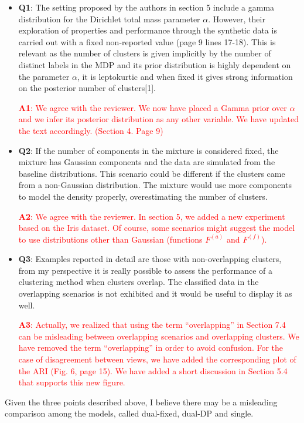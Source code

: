 \documentclass[]{article}
\newcommand\done[1]{\textcolor{red}{#1}}
\begin{document}
	\vspace{3mm}	
	\begin{itemize}
		\item \textbf{Q1}: The setting proposed by the authors in section 5 include a gamma distribution for the Dirichlet total mass parameter $\alpha$. However, their exploration of properties and performance through the synthetic data is carried out with a fixed non-reported value (page 9 lines 17-18). This is relevant as the number of clusters is given implicitly by the number of distinct labels in the MDP and its prior distribution is highly dependent on the parameter $\alpha$, it is leptokurtic and when fixed it gives strong information on the posterior number of clusters[1].
		
		\textcolor{red}{  \textbf{A1}: We agree with the reviewer. We now have placed a Gamma prior over $\alpha$ and we infer its posterior distribution as any other variable. We have updated the text accordingly. (Section 4. Page 9)} 
		
		\item \textbf{Q2}: If the number of components in the mixture is considered fixed, the mixture has Gaussian components and the data are simulated from the baseline distributions. This scenario could be different if the clusters came from a non-Gaussian distribution. The mixture would use more components to model the density properly, overestimating the number of clusters.
		
		\done{
			\textbf{A2}: We agree with the reviewer. In section 5, we added a new experiment based on the Iris dataset.
			Of course, some scenarios might suggest the model to use distributions other than Gaussian (functions $F^{(a)}$ and $F^{(f)}$).    
		}
		
		\item \textbf{Q3}: Examples reported in detail are those with non-overlapping clusters, from my perspective it is really possible to assess the performance of a clustering method when clusters overlap. The classified data in the overlapping scenarios is not exhibited and it would be useful to display it as well.
		
		\done{
			\textbf{A3}: Actually, we realized that using the term ``overlapping'' in Section 7.4 can be misleading between overlapping scenarios and overlapping clusters. We have removed the term ``overlapping'' in order to avoid confusion.
		}			
		\done{
			For the case of disagreement between views, we have added the corresponding plot of the ARI (Fig. 6, page 15).
			We have added a short discussion in Section 5.4 that supports this new figure.
		}
		
	\end{itemize}
	Given the three points described above, I believe there may be a misleading comparison among the models, called dual-fixed, dual-DP and single.
	
\end{document}
